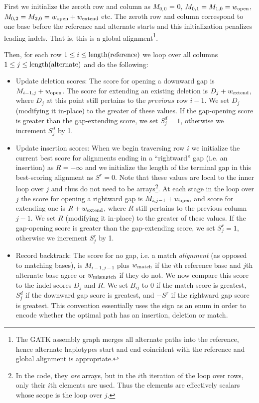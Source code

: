 \documentclass[nofootinbib,amssymb,amsmath]{revtex4}
\begin{document}
First we initialize the zeroth row and column as $M_{0,0}$ = 0, $M_{0,1} = M_{1,0} = w_{\rm open}$, $M_{0,2} = M_{2,0} = w_{\rm open} + w_{\rm extend}$ etc.  The zeroth row and column correspond to one base before the reference and alternate starts and this initialization penalizes leading indels.  That is, this is a global alignment\footnote{The GATK assembly graph merges all alternate paths into the reference, hence alternate haplotypes start and end coincident with the reference and global alignment is appropriate.}.

Then, for each row $1 \le i \le {\rm length(reference)}$ we loop over all columns $1 \le j \le {\rm length(alternate)}$ and do the following:

\begin{itemize}
\item Update deletion scores:  The score for opening a downward gap is $M_{i-1,j} + w_{\rm open}$.  The score for extending an existing deletion is $D_j + w_{\rm extend}$, where $D_j$ at this point still pertains to the $previous$ row $i - 1$.  We set $D_j$ (modifying it in-place) to the greater of these values. If the gap-opening score is greater than the gap-extending score, we set $S^d_j = 1$, otherwise we increment $S^d_j$ by 1.
\item Update insertion scores:  When we begin traversing row $i$ we initialize the current best score for alignments ending in a ``rightward'' gap (i.e. an insertion) as $R = -\infty$ and we initialize the length of the terminal gap in this best-scoring alignment as $S^r = 0$.  Note that these values are local to the inner loop over $j$ and thus do not need to be arrays\footnote{In the code, they \textit{are} arrays, but in the $i$th iteration of the loop over rows, only their $i$th elements are used.  Thus the elements are effectively scalars whose scope is the loop over $j$.}.  At each stage in the loop over $j$ the score for opening a rightward gap is $M_{i,j - 1} + w_{\rm open}$ and score for extending one is $R + w_{\rm extend}$, where $R$ still pertains to the previous column $j - 1$.  We set $R$ (modifying it in-place)  to the greater of these values.  If the gap-opening score is greater than the gap-extending score, we set $S^r_j = 1$, otherwise we increment $S^r_j$ by 1.
\item Record backtrack: The score for no gap, i.e. a match \textit{alignment} (as opposed to matching bases), is $M_{i-1,j-1}$ plus $w_{\rm match}$ if the $i$th reference base and $j$th alternate base agree or $w_{\rm mismatch}$ if they do not.  We now compare this score to the indel scores $D_j$ and $R$.  We set $B_{ij}$ to 0 if the match score is greatest, $S^d_j$ if the downward gap score is greatest, and $-S^r$ if the rightward gap score is greatest.  This convention essentially uses the sign as an enum in order to encode whether the optimal path has an insertion, deletion or match.
\end{itemize}
\end{document}
